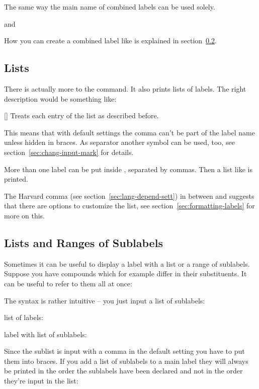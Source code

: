 \documentclass[load-preamble+,babel-options={ngerman,british,american}]{cnltx-doc}
\begin{document}
The same way the main name of combined labels can be used solely.
\begin{example}
   and 
\end{example}

How you can create a combined label like  is explained in
section~\ref{sec:lists-rang-subl}.

\subsection{Lists}\label{sec:lists}
There is actually more to the  command.  It also prints lists of
labels.  The right description would be something like:
\begin{commands}
  []
    Treats each entry of the list as described before.
\end{commands}
This means that with default settings the comma can't be part of the label
name unless hidden in braces.  As separator another symbol can be used, too,
see section~\ref{sec:chang-input-mark} for details.

\begin{example}
  More than one label can be put inside , separated by commas.  Then
  a list like  is printed.
\end{example}
The Harvard comma (see section~\ref{sec:lang-depend-sett}) in 
between  and  suggests that there are options to customize
the list, see section~\ref{sec:formatting-labels} for more on this.

\subsection{Lists and Ranges of Sublabels}\label{sec:lists-rang-subl}
Sometimes it can be useful to display a label with a list or a range of
sublabels.  Suppose you have compounds
 which for example differ in their
substituents.  It can be useful to refer to them all at once:

The syntax is rather intuitive -- you just input a list of sublabels:
\begin{example}
  list of labels: \par
  label with list of sublabels: 
\end{example}
Since the sublist is input with a comma in the default setting you have to
put them into braces.  If you add a list of sublabels to a main label they
will always be printed in the order the sublabels have been declared and not
in the order they're input in the list:
\end{document}
